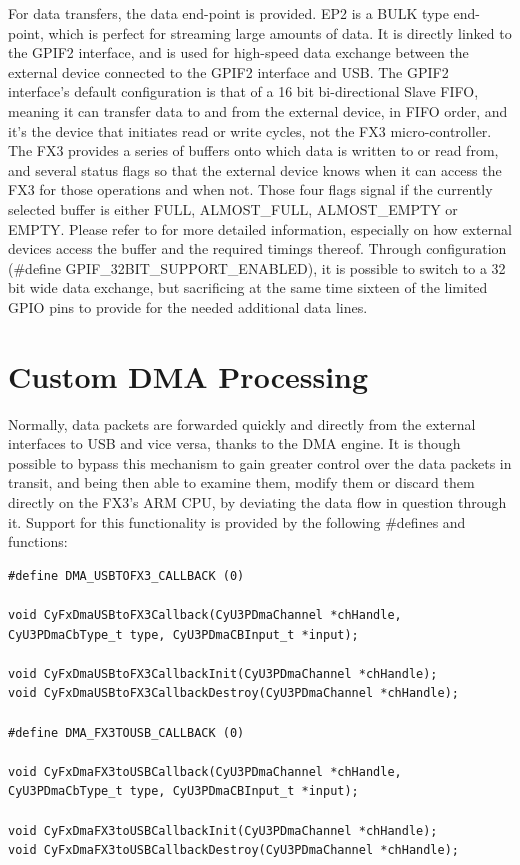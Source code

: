 \documentclass[a4paper,12pt]{report}
\begin{document}
For data transfers, the data end-point is provided. EP2 is a BULK type end-point, which is perfect for streaming large amounts of data. It is directly linked to the GPIF2 interface, and is used for high-speed data exchange between the external device connected to the GPIF2 interface and USB.
The GPIF2 interface's default configuration is that of a 16 bit bi-directional Slave FIFO, meaning it can transfer data to and from the external device, in FIFO order, and it's the device that initiates read or write cycles, not the FX3 micro-controller. The FX3 provides a series of buffers onto which data is written to or read from, and several status flags so that the external device knows when it can access the FX3 for those operations and when not. Those four flags signal if the currently selected buffer is either FULL, ALMOST\_FULL, ALMOST\_EMPTY or EMPTY. Please refer to \cite{AN65974} for more detailed information, especially on how external devices access the buffer and the required timings thereof.
Through configuration (\#define GPIF\_32BIT\_SUPPORT\_ENABLED), it is possible to switch to a 32 bit wide data exchange, but sacrificing at the same time sixteen of the limited GPIO pins to provide for the needed additional data lines.

\section{Custom DMA Processing} \label{sec:custom_dma_processing}

Normally, data packets are forwarded quickly and directly from the external interfaces to USB and vice versa, thanks to the DMA engine. It is though possible to bypass this mechanism to gain greater control over the data packets in transit, and being then able to examine them, modify them or discard them directly on the FX3's ARM CPU, by deviating the data flow in question through it. Support for this functionality is provided by the following \#defines and functions:

\begin{lstlisting}
#define DMA_USBTOFX3_CALLBACK (0)

void CyFxDmaUSBtoFX3Callback(CyU3PDmaChannel *chHandle, CyU3PDmaCbType_t type, CyU3PDmaCBInput_t *input);

void CyFxDmaUSBtoFX3CallbackInit(CyU3PDmaChannel *chHandle);
void CyFxDmaUSBtoFX3CallbackDestroy(CyU3PDmaChannel *chHandle);

#define DMA_FX3TOUSB_CALLBACK (0)

void CyFxDmaFX3toUSBCallback(CyU3PDmaChannel *chHandle, CyU3PDmaCbType_t type, CyU3PDmaCBInput_t *input);

void CyFxDmaFX3toUSBCallbackInit(CyU3PDmaChannel *chHandle);
void CyFxDmaFX3toUSBCallbackDestroy(CyU3PDmaChannel *chHandle);
\end{lstlisting}
\end{document}
